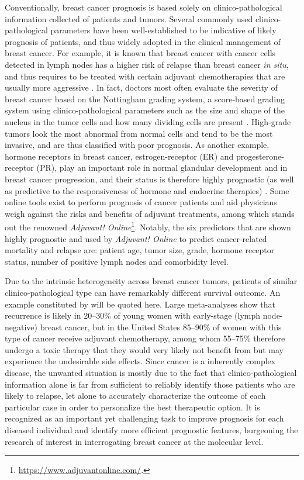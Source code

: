 Conventionally, breast cancer prognosis is based solely on clinico-pathological information collected of patients and tumors. Several commonly used clinico-pathological parameters have been well-established to be indicative of likely prognosis of patients, and thus widely adopted in the clinical management of breast cancer. For example, it is known that breast cancer with cancer cells detected in lymph nodes has a higher risk of relapse than breast cancer \textit{in situ}, and thus requires to be treated with certain adjuvant chemotherapies that are usually more aggressive \cite{Moffat2014Clinical}. In fact, doctors most often evaluate the severity of breast cancer based on the Nottingham grading system, a score-based grading system using clinico-pathological parameters such as the size and shape of the nucleus in the tumor cells and how many dividing cells are present \cite{Cancer2010AJCC}. High-grade tumors look the most abnormal from normal cells and tend to be the most invasive, and are thus classified with poor prognosis. As another example, hormone receptors in breast cancer, estrogen-receptor (ER) and progesterone-receptor (PR), play an important role in normal glandular development and in breast cancer progression, and their status is therefore highly prognostic (as well as predictive to the responsiveness of hormone and endocrine therapies) \cite{Moffat2014Clinical}. Some online tools exist to perform prognosis of cancer patients and aid physicians weigh against the risks and benefits of adjuvant treatments, among which stands out the renowned \textit{Adjuvant! Online}\footnote{\url{https://www.adjuvantonline.com/}.}. Notably, the six predictors that are shown highly prognostic and used by \textit{Adjuvant! Online} to predict cancer-related mortality and relapse are: patient age, tumor size, grade, hormone receptor status, number of positive lymph nodes and comorbidity level.


Due to the intrinsic heterogeneity across breast cancer tumors, patients of similar clinico-pathological type can have remarkably different survival outcome. An example constituted by \cite{Veer2008Enabling} will be quoted here. Large meta-analyses show that recurrence is likely in 20--30\% of young women with early-stage (lymph node-negative) breast cancer, but in the United States 85--90\% of women with this type of cancer receive adjuvant chemotherapy, among whom 55--75\% therefore undergo a toxic therapy that they would very likely not benefit from but may experience the undesirable side effects. Since cancer is a inherently complex disease, the unwanted situation is mostly due to the fact that clinico-pathological information alone is far from sufficient to reliably identify those patients who are likely to relapse, let alone to accurately characterize the outcome of each particular case in order to personalize the best therapeutic option. It is recognized as an important yet challenging task to improve prognosis for each diseased individual and identify more efficient prognostic features, burgeoning the research of interest in interrogating breast cancer at the molecular level.





